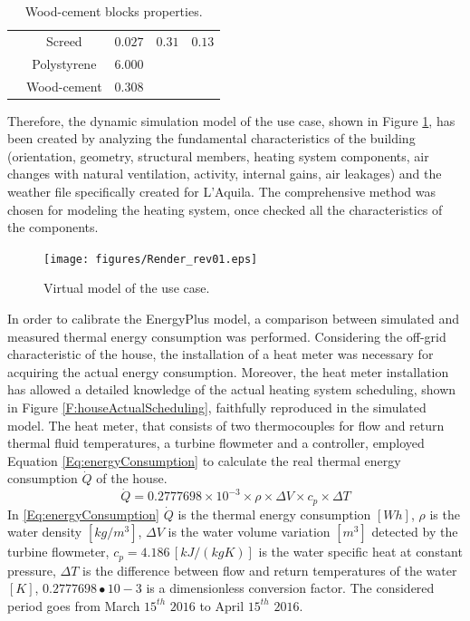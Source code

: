 \begin{table}[h!]
\begin{tabular}{ccccc}
														  & Screed                                                                         & $0.027$    		    & $0.31 $   &  $0.13 $     \\
							        					  & Polystyrene                                                                    & $6.000$    		    &           &              \\ 
							        					  & Wood-cement                                                                    & $0.308 $   		    &           &              \\
		\bottomrule
	\end{tabular}
	\caption{Wood-cement blocks properties.}
	\captionsetup{justification=centering}
	\label{T:houseProperties}
\end{table}

Therefore, the dynamic simulation model of the use case, shown in Figure \ref{F:houseVirtualModel}, has been created by analyzing the fundamental characteristics of the building (orientation, geometry, structural members, heating system components, air changes with natural ventilation, activity, internal gains, air leakages) and the weather file specifically created for L'Aquila. The comprehensive method was chosen for modeling the heating system, once checked all the characteristics of the components.

\begin{figure}[h!]
	\begin{center}
		\texttt{[image: figures/Render\_rev01.eps]}
		\caption{Virtual model of the use case.}
		\captionsetup{justification=centering}
		\label{F:houseVirtualModel}
	\end{center}
\end{figure}

In order to calibrate the EnergyPlus model, a comparison between simulated and measured thermal energy consumption was performed. Considering the off-grid characteristic of the house, the installation of a heat meter was necessary for acquiring the actual energy consumption. Moreover, the heat meter installation has allowed a detailed knowledge of the actual heating system scheduling, shown in Figure \ref{F:houseActualScheduling}, faithfully reproduced in the simulated model. The heat meter, that consists of two thermocouples for flow and return thermal fluid temperatures, a turbine flowmeter and a controller, employed Equation \eqref{Eq:energyConsumption} to calculate the real thermal energy consumption $\dot Q$ of the house.
\begin{equation}\label{Eq:energyConsumption}
\dot Q = 0.2777698\times10^{-3}\times\rho\times\Delta V\times c_p\times\Delta T
\end{equation}
In \eqref{Eq:energyConsumption} $\dot Q$ is the thermal energy consumption $[Wh]$, $\rho$ is the water density $[kg/m^3]$, $\Delta V$ is the water volume variation $[m^3]$ detected by the turbine flowmeter, $c_p = 4.186\, [kJ/(kgK)]$ is the water specific heat at constant pressure, $\Delta T$ is the difference between flow and return temperatures of the water $[K]$, $0.2777698∙10−3$ is a dimensionless conversion factor. The considered period goes from March $15^{th}$ $2016$ to April $15^{th}$ $2016$.

